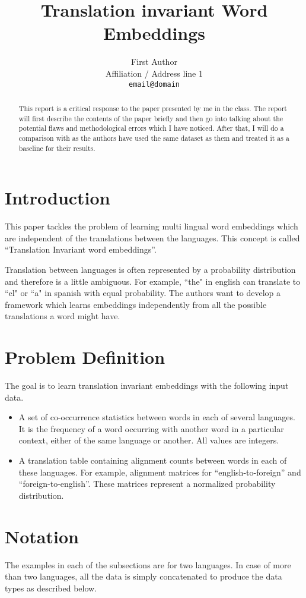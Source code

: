 \documentclass[11pt]{article}
\title{Translation invariant Word Embeddings}
\author{First Author \\
  Affiliation / Address line 1 \\
  {\tt email@domain}}
\date{}
\begin{document}
\maketitle
\begin{abstract}
This report is a critical response to the paper \cite{huang2015translation} presented by me in the class. The report will first describe the contents of the paper briefly and then go into talking about the potential flaws and methodological errors which I have noticed. After that, I will do a comparison with \cite{faruqui2014improving} as the authors have used the same dataset as them and treated it as a baseline for their results.
\end{abstract}

\section{Introduction}
This paper tackles the problem of learning multi lingual word embeddings which are independent of the translations between the languages.  This concept is called “Translation Invariant word embeddings”.

Translation between languages is often represented by a probability distribution and therefore is a little ambiguous. For example, ``the" in english can translate to ``el" or ``a" in spanish with equal probability. The authors want to develop a framework which learns embeddings independently from all the possible translations a word might have.

\section{Problem Definition}
The goal is to learn translation invariant embeddings with the following input data.
\begin{itemize}
\item A set of co-occurrence statistics between words in each of several languages. It is the frequency of a word occurring with another word in a particular context, either of the same language or another. All values are integers.
\item A translation table containing alignment counts between words in each of these languages. For example, alignment matrices for “english-to-foreign” and “foreign-to-english”. These matrices represent a normalized probability distribution.
\end{itemize}

\section{Notation}
The examples in each of the subsections are for two languages. In case of more than two languages, all the data is simply concatenated to produce the data types as described below.
\end{document}
